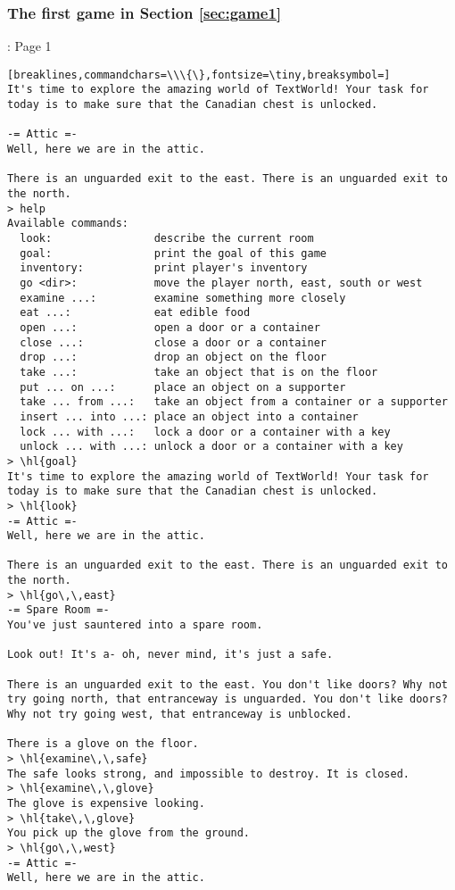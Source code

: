 \subsubsection{The first game in Section \ref{sec:game1}}\label{sec:game1_log}
\begin{AIbox}[width=0.9\textwidth]{\DV: Page 1}
\begin{Verbatim}[breaklines,commandchars=\\\{\},fontsize=\tiny,breaksymbol=]
It's time to explore the amazing world of TextWorld! Your task for today is to make sure that the Canadian chest is unlocked.

-= Attic =-
Well, here we are in the attic.

There is an unguarded exit to the east. There is an unguarded exit to the north.
> help
Available commands:
  look:                describe the current room
  goal:                print the goal of this game
  inventory:           print player's inventory
  go <dir>:            move the player north, east, south or west
  examine ...:         examine something more closely
  eat ...:             eat edible food
  open ...:            open a door or a container
  close ...:           close a door or a container
  drop ...:            drop an object on the floor
  take ...:            take an object that is on the floor
  put ... on ...:      place an object on a supporter
  take ... from ...:   take an object from a container or a supporter
  insert ... into ...: place an object into a container
  lock ... with ...:   lock a door or a container with a key
  unlock ... with ...: unlock a door or a container with a key
> \hl{goal}
It's time to explore the amazing world of TextWorld! Your task for today is to make sure that the Canadian chest is unlocked.
> \hl{look}
-= Attic =-
Well, here we are in the attic.

There is an unguarded exit to the east. There is an unguarded exit to the north.
> \hl{go\,\,east}
-= Spare Room =-
You've just sauntered into a spare room.

Look out! It's a- oh, never mind, it's just a safe.

There is an unguarded exit to the east. You don't like doors? Why not try going north, that entranceway is unguarded. You don't like doors? Why not try going west, that entranceway is unblocked.

There is a glove on the floor.
> \hl{examine\,\,safe}
The safe looks strong, and impossible to destroy. It is closed.
> \hl{examine\,\,glove}
The glove is expensive looking.
> \hl{take\,\,glove}
You pick up the glove from the ground.
> \hl{go\,\,west}
-= Attic =-
Well, here we are in the attic.


\end{Verbatim}
\end{AIbox}
